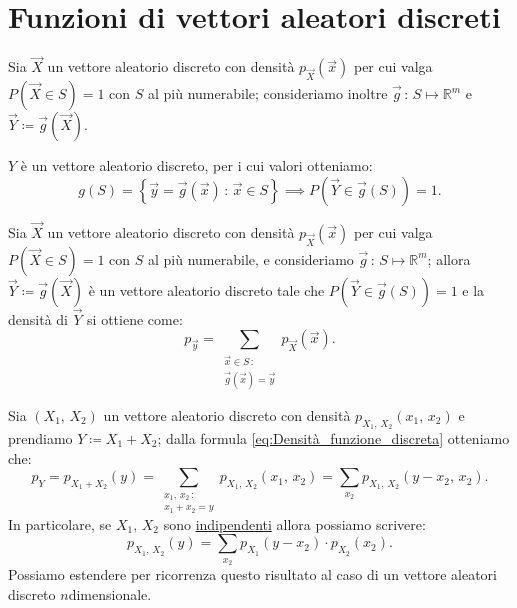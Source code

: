     \section{Funzioni di vettori aleatori discreti}
    \begin{defn}\label{defn:Funzione_discreta}
            Sia $\vec{X}$ un vettore aleatorio discreto con densità $p_{\vec{X}}(\vec{x})$ per cui valga $P(\vec{X} \in S) = 1$ con $S$ al più numerabile; consideriamo inoltre $\vec{g}\,:\, S \mapsto \mathbb{R}^m$ e $\vec{Y} \coloneqq \vec{g}(\vec{X})$.

            $Y$ è un vettore aleatorio discreto, per i cui valori otteniamo:  \[
                g(S) = \left\{\vec{y} = \vec{g}(\vec{x}) \,:\, \vec{x} \in S\right\} \implies 
                P(\vec{Y} \in \vec{g}(S)) = 1
            .\]
        \end{defn}
        \begin{prty}\label{prty:Densità_funzione_discreta}
            Sia $\vec{X}$ un vettore aleatorio discreto con densità $p_{\vec{X}}(\vec{x})$ per cui valga $P(\vec{X} \in S) = 1$ con $S$ al più numerabile, e consideriamo $\vec{g}\,:\, S \mapsto \mathbb{R}^m$; allora $\vec{Y} \coloneqq  \vec{g}(\vec{X})$ è un vettore aleatorio discreto tale che $P(\vec{Y} \in \vec{g}(S)) = 1$ e la densità di $\vec{Y}$ si ottiene come:
            \begin{equation}\label{eq:Densità_funzione_discreta}
                p_{\vec{y}} = \!\!\! \sum_{\substack{\vec{x} \in S \,:\\ 
                \vec{g}(\vec{x}) = \vec{y}}} \!\! p_{\vec{X}}(\vec{x})
            .\end{equation}
        \end{prty}
        \begin{prty}\label{prty:Somma_variabili_aleatorio_discrete}
            Sia $(X_1,\, X_2)$ un vettore aleatorio discreto con densità $p_{X_1,\,X_2}(x_1,\, x_2)$ e prendiamo $Y\coloneqq X_1 + X_2$; dalla formula \eqref{eq:Densità_funzione_discreta} otteniamo che: \[
                p_{Y} = p_{X_1 + X_2}(y) = \!\!\!\! \sum_{\substack{x_1,\,x_2 \,:\\
                x_1 + x_2 = y}} \!\!\! p_{X_1,\, X_2}(x_1,\, x_2) = 
                \sum_{x_2}p_{X_1,\, X_2}(y - x_2,\, x_2)
            .\] In particolare, se $X_1,\, X_2$ sono \underline{indipendenti} allora possiamo scrivere: \[
            p_{X_1,\, X_2}(y) = \sum_{x_2} p_{X_1}(y-x_2)\cdot p_{X_2}(x_2)
            .\]  Possiamo estendere per ricorrenza questo risultato al caso di un vettore aleatori discreto $n$\nbdash dimensionale.
        \end{prty}
